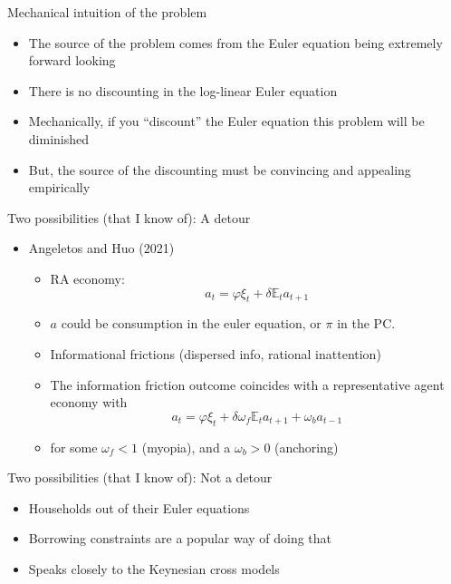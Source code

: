 \documentclass[english,xcolor=svgnames]{beamer}
\begin{document}
\begin{frame}{Mechanical intuition of the problem}
\begin{itemize}
\item The source of the problem comes from the Euler equation being extremely forward looking
\item There is no discounting in the log-linear Euler equation
\item Mechanically, if you ``discount'' the Euler equation this problem will be diminished
\item But, the source of the discounting must be convincing and appealing empirically
\end{itemize}
\end{frame}

\begin{frame}{Two possibilities (that I know of): A detour}
\begin{itemize}
\item Angeletos and Huo (2021)
\begin{itemize}
\item RA economy:
\[a_t = \varphi \xi_t  + \delta \mathbb{E}_t a_{t+1}\]
\item $a$ could be consumption in the euler equation, or $\pi$ in the PC.
\item Informational frictions (dispersed info, rational inattention)
\item The information friction outcome coincides with a representative agent economy with
\[a_t = \varphi \xi_t  + \delta \omega_f \mathbb{E}_t a_{t+1} + \omega_b a_{t-1}\]
\item for some $\omega_f < 1$ (myopia), and a $\omega_b>0$ (anchoring)
\end{itemize}
\end{itemize}
\end{frame}

\begin{frame}{Two possibilities (that I know of): Not a detour}
\begin{itemize}
\item Households out of their Euler equations
\item Borrowing constraints are a popular way of doing that
\item Speaks closely to the Keynesian cross models
\end{itemize}
\end{frame}
\end{document}
